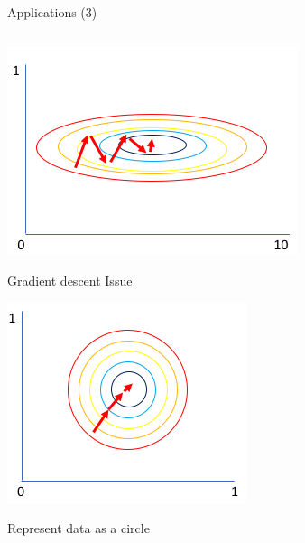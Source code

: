 \documentclass[aspectratio=169]{beamer}
\begin{document}
\begin{frame}[t]{Applications (3)}
\begin{columns}[T,onlytextwidth]
\begin{column}{0.35\textwidth}
\begin{minipage}{0.40\textwidth}
                    \end{minipage}
                    \begin{minipage}{0.58\textwidth}
                        \centering\includegraphics[width=\textwidth,keepaspectratio]{unnormalized.png}
                    \end{minipage}\hfill
                    \begin{minipage}{0.40\textwidth}
                        Gradient descent Issue
                    \end{minipage}
                    \begin{minipage}{0.58\textwidth}
                        \centering\includegraphics[width=\textwidth,keepaspectratio]{normalized.png}
                    \end{minipage}\hfill
                    \begin{minipage}{0.40\textwidth}
                        Represent data as a circle
                    \end{minipage}
            \end{column}
        \end{columns}
    \end{frame}
\end{document}
